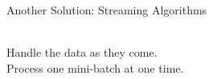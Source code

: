 \begin{frame}{Another Solution: Streaming Algorithms}
\begin{center}
    \\
    Handle the data as they come.\\
    Process one \alert<1-8>{mini-batch} at one time.
  \end{center}
\end{frame}
